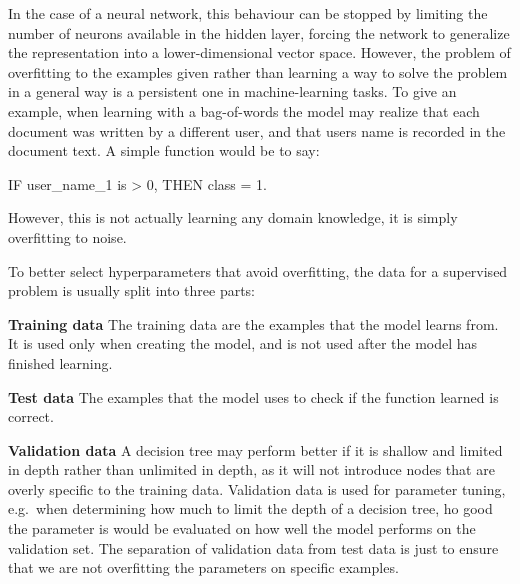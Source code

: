 In the case of a neural network,  this behaviour can be stopped by limiting the number of neurons available in the hidden layer, forcing the network to generalize the representation into a lower-dimensional vector space. However, the problem of overfitting to the examples given rather than learning a way to solve the problem in a general way is a persistent one in machine-learning tasks. To give an example, when learning with a bag-of-words the model may realize that each document was written by a different user, and that users name is recorded in the document text. A simple function would be to say:


IF user\_name\_1 is > 0, THEN class = 1.

However, this is not actually learning any domain knowledge, it is simply overfitting to noise.


To better select hyperparameters that avoid overfitting, the data for a supervised problem is usually split into three parts:

\textbf{Training data} The training data are the examples that the model learns from. It is used only when creating the model, and is not used after the model has finished learning.

\textbf{Test data} The examples that the model uses to check if the function learned is correct.

\textbf{Validation data} A decision tree may perform better if it is shallow and limited in depth rather than unlimited in depth, as it will not introduce nodes that are overly specific to the training data. Validation data is used for parameter tuning, e.g.\ when determining how much to limit the depth of a decision tree, ho good the parameter is would be evaluated on how well the model performs on the validation set. The separation of validation data from test data is just to ensure that we are not overfitting the parameters on specific examples.














